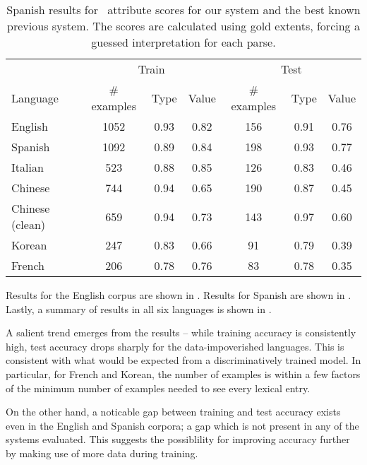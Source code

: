 \begin{table*}
	\begin{center}
	\begin{tabular}{|l|c|c|c|c|c|c|}
		\hline
		       & \multicolumn{3}{c|}{Train} & \multicolumn{3}{c|}{Test} \\
		Language & \# examples & Type & Value  & \# examples & Type & Value \\
		\hline
		\hline
		English          & 1052 & 0.93 & 0.82  & 156 & 0.91 & 0.76 \\
		Spanish          & 1092 & 0.89 & 0.84  & 198 & 0.93 & 0.77 \\
		Italian          & 523  & 0.88 & 0.85  & 126 & 0.83 & 0.46 \\
		Chinese          & 744  & 0.94 & 0.65  & 190 & 0.87 & 0.45 \\
		Chinese (clean)  & 659  & 0.94 & 0.73  & 143 & 0.97 & 0.60 \\
		Korean           & 247  & 0.83 & 0.66  & 91  & 0.79 & 0.39 \\
		French           & 206  & 0.78 & 0.76  & 83  & 0.78 & 0.35 \\
		\hline
	\end{tabular}
	\caption{
		Spanish results for \tempeval\ attribute scores for our system and
      the best known previous system.
		The scores are calculated using gold extents, forcing a guessed
		interpretation for each parse.
		\label{tab:results-all}
	}
	\end{center}
\end{table*}

Results for the English corpus are shown in .
Results for Spanish are shown in .
Lastly, a summary of results in all six languages is shown in
  .

A salient trend emerges from the results -- while training accuracy is
  consistently high, test accuracy drops sharply for the data-impoverished
  languages.
This is consistent with what would be expected from a discriminatively trained
  model.
In particular, for French and Korean, the number of examples is within a
  few factors of the minimum number of examples needed to see every
  lexical entry.

On the other hand, a noticable gap between training and test accuracy exists
  even in the English and Spanish corpora; a gap which is not present in any
  of the systems evaluated.
This suggests the possiblility for improving accuracy further by making use of
  more data during training.
